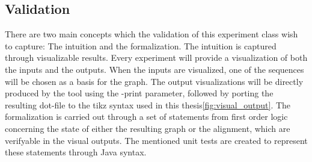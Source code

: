 \documentclass[thesis.tex]{subfiles}
\begin{document}
\subsection{Validation}
There are two main concepts which the validation of this experiment class wish to capture: The intuition and the formalization. The intuition is captured through visualizable results. Every experiment will provide a visualization of both the inputs and the outputs. When the inputs are visualized, one of the sequences will be chosen as a basis for the graph. The output visualizations will be directly produced by the tool using the -print parameter, followed by porting the resulting dot-file to the tikz syntax used in this thesis\ref{fig:visual_output}. The formalization is carried out through a set of statements from first order logic concerning the state of either the resulting graph or the alignment, which are verifyable in the visual outputs. The mentioned unit tests are created to represent these statements through Java syntax.
\end{document}
